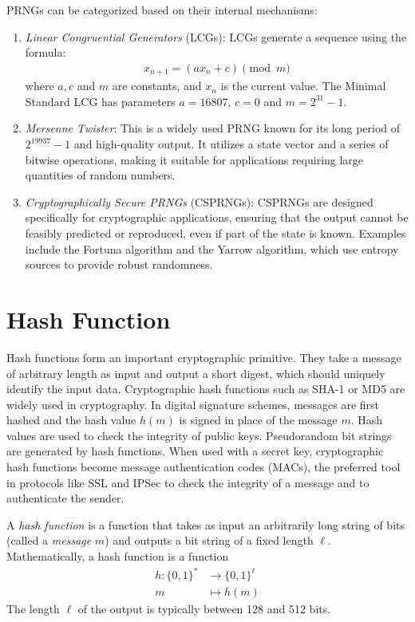 \documentclass[a4paper, 12pt]{book} %
\begin{document}
PRNGs can be categorized based on their internal mechanisms:
\begin{enumerate}
    \item \emph{Linear Congruential Generators} (LCGs): LCGs generate a sequence using the formula:
    \begin{align}
        x_{n+1} = (ax_{n} + c) \pmod{m}
    \end{align}
    where $a, c$ and $m$ are constants, and $x_n$ is the current value. The Minimal Standard LCG has parameters $a = 16807$, $c=0$ and $m = 2^{31}-1$.
    \item \emph{Mersenne Twister}: This is a widely used PRNG known for its long period of $2^{19937}-1$ and high-quality output. It utilizes a state vector and a series of bitwise operations, making it suitable for applications requiring large quantities of random numbers.
    \item \emph{Cryptographically Secure PRNGs} (CSPRNGs): CSPRNGs are designed specifically for cryptographic applications, ensuring that the output cannot be feasibly predicted or reproduced, even if part of the state is known. Examples include the Fortuna algorithm and the Yarrow algorithm, which use entropy sources to provide robust randomness.
\end{enumerate}



\chapter{Hash Function}

Hash functions form an important cryptographic primitive. They take a message of arbitrary length as input and output a short digest, which should uniquely identify the input data. Cryptographic hash functions such as SHA-1 or MD5 are widely used in cryptography. In digital signature schemes, messages are first hashed and the hash value $h(m)$ is signed in place of the message $m$. Hash values are used to check the integrity of public keys. Pseudorandom bit strings are generated by hash functions. When used with a secret key, cryptographic hash functions become message authentication codes (MACs), the preferred tool in protocols like SSL and IPSec to check the integrity of a message and to authenticate the sender.

\begin{definition}
    A \emph{hash function} is a function that takes as input an arbitrarily long string of bits (called a \emph{message} $m$) and outputs a bit string of a fixed length $\ell$. Mathematically, a hash function is a function
    \begin{align}
        h: \{0,1\}^* &\longrightarrow \{0,1\}^\ell \\
        m &\longmapsto h(m)
    \end{align}
    The length $\ell$ of the output is typically between 128 and 512 bits. 
\end{definition}
\end{document}
